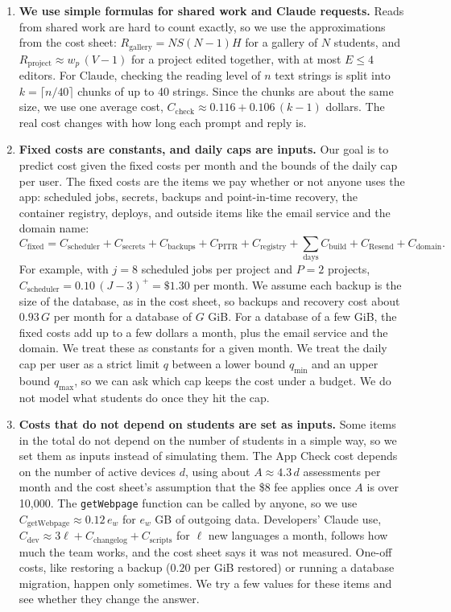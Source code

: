 \documentclass{article}
\begin{document}
\begin{enumerate}
    \item \textbf{We use simple formulas for shared work and Claude requests.}
    Reads from shared work are hard to count exactly, so we use the approximations from the cost sheet: $R_{\text{gallery}} = NS(N-1)H$ for a gallery of $N$ students, and $R_{\text{project}} \approx w_p\,(V-1)$ for a project edited together, with at most $E \le 4$ editors. For Claude, checking the reading level of $n$ text strings is split into $k=\lceil n/40\rceil$ chunks of up to 40 strings. Since the chunks are about the same size, we use one average cost, $C_{\text{check}} \approx 0.116 + 0.106\,(k-1)$ dollars. The real cost changes with how long each prompt and reply is.

    \item \textbf{Fixed costs are constants, and daily caps are inputs.}
    Our goal is to predict cost given the fixed costs per month and the bounds of the daily cap per user. The fixed costs are the items we pay whether or not anyone uses the app: scheduled jobs, secrets, backups and point-in-time recovery, the container registry, deploys, and outside items like the email service and the domain name:
    \[
    C_{\text{fixed}} = C_{\text{scheduler}} + C_{\text{secrets}} + C_{\text{backups}} + C_{\text{PITR}} + C_{\text{registry}} + \sum_{\text{days}} C_{\text{build}} + C_{\text{Resend}} + C_{\text{domain}}.
    \]
    For example, with $j=8$ scheduled jobs per project and $P=2$ projects, $C_{\text{scheduler}} = 0.10\,(J-3)^+ = \$1.30$ per month. We assume each backup is the size of the database, as in the cost sheet, so backups and recovery cost about $0.93\,G$ per month for a database of $G$ GiB. For a database of a few GiB, the fixed costs add up to a few dollars a month, plus the email service and the domain. We treat these as constants for a given month. We treat the daily cap per user as a strict limit $q$ between a lower bound $q_{\min}$ and an upper bound $q_{\max}$, so we can ask which cap keeps the cost under a budget. We do not model what students do once they hit the cap.

    \item \textbf{Costs that do not depend on students are set as inputs.}
    Some items in the total do not depend on the number of students in a simple way, so we set them as inputs instead of simulating them. The App Check cost depends on the number of active devices $d$, using about $A \approx 4.3\,d$ assessments per month and the cost sheet's assumption that the \$8 fee applies once $A$ is over 10{,}000. The \texttt{getWebpage} function can be called by anyone, so we use $C_{\text{getWebpage}} \approx 0.12\,e_w$ for $e_w$ GB of outgoing data. Developers' Claude use, $C_{\text{dev}} \approx 3\ell + C_{\text{changelog}} + C_{\text{scripts}}$ for $\ell$ new languages a month, follows how much the team works, and the cost sheet says it was not measured. One-off costs, like restoring a backup ($0.20$ per GiB restored) or running a database migration, happen only sometimes. We try a few values for these items and see whether they change the answer.


\end{enumerate}
\end{document}
